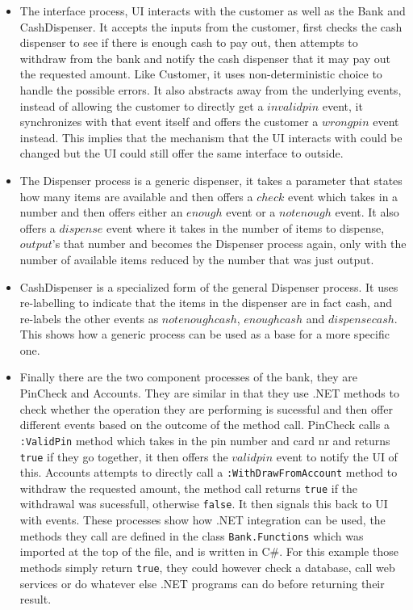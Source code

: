 \begin{itemize}
		\item The interface process, \textsf{UI} interacts with the customer as 
		well as the \textsf{Bank} and \textsf{CashDispenser}. It accepts the 
		inputs from the customer, first checks the cash dispenser to see if there 
		is enough cash to pay out, then attempts to withdraw from the bank and 
		notify the cash dispenser that it may pay out the requested amount. Like 
		\textsf{Customer}, it uses non-deterministic choice to handle the possible 
		errors. It also abstracts away from the underlying events, instead of 
		allowing the customer to directly get a $invalidpin$ event, it 
		synchronizes with that event itself and offers the customer a $wrongpin$ 
		event instead. This implies that the mechanism that the UI interacts with 
		could be changed but the UI could still offer the same interface to 
		outside.
		
		\item The \textsf{Dispenser} process is a generic dispenser, it takes a 
		parameter that states how many items are available and then offers a 
		$check$ event which takes in a number and then offers either an $enough$ 
		event or a $notenough$ event. It also offers a $dispense$ event where it 
		takes in the number of items to dispense, $output$'s that number and 
		becomes the \textsf{Dispenser} process again, only with the number of 
		available items reduced by the number that was just output.
		
		\item \textsf{CashDispenser} is a specialized form of the general 
		\textsf{Dispenser} process. It uses re-labelling to indicate that the 
		items in the dispenser are in fact cash, and re-labels the other events as 
		$notenoughcash$, $enoughcash$ and $dispensecash$. This shows how a generic 
		process can be used as a base for a more specific one.
		
		\item Finally there are the two component processes of the bank, they are 
		\textsf{PinCheck} and \textsf{Accounts}. They are similar in that they use 
		.NET methods to check whether the operation they are performing is 
		sucessful and then offer different events based on the outcome of the 
		method call. \textsf{PinCheck} calls a \texttt{:ValidPin} method which 
		takes in the pin number and card nr and returns \texttt{true} if they go 
		together, it then offers the $validpin$ event to notify the \textsf{UI} of 
		this. \textsf{Accounts} attempts to directly call a 
		\texttt{:WithDrawFromAccount} method to withdraw the requested amount, the 
		method call returns \texttt{true} if the withdrawal was sucessfull, 
		otherwise \texttt{false}. It then signals this back to \textsf{UI} with 
		events. These processes show how .NET integration can be used, the methods 
		they call are defined in the class \texttt{Bank.Functions} which was 
		imported at the top of the file, and is written in C\#. For this example 
		those methods simply return \texttt{true}, they could however check a 
		database, call web services or do whatever else .NET programs can do 
		before returning their result.
		
  \end{itemize}


